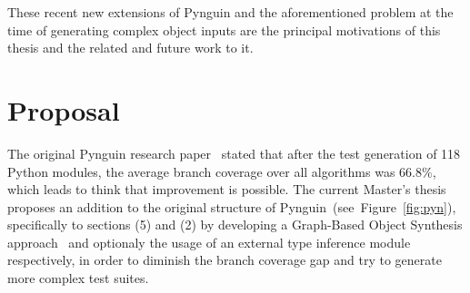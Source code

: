 \documentclass[%
  chapterprefix=false,%
  open=right,%
  twoside=true,%
  paper=a4,%
  logofile={Figures/logo.png},%
  thesistype=master,%
  UKenglish,%
]{se2thesis}
\begin{document}
These recent new extensions of Pynguin and the aforementioned problem at the time of generating complex object inputs are the principal motivations of this thesis and the related and future work to it.

\chapter{Proposal}

The original Pynguin research paper~\cite{DBLP:conf/icse/LukasczykF22} stated that after the test generation of 118 Python modules, the average branch coverage over all algorithms was $66.8\%$, which leads to think that improvement is possible.
The current Master's thesis proposes an addition to the original structure of Pynguin~(see~Figure~\ref{fig:pyn}), specifically to sections (5) and (2) by developing
a Graph-Based Object Synthesis approach~\cite{DBLP:conf/sigsoft/0001O00D21} and optionaly the usage of an external type inference module respectively, in order to diminish the branch coverage gap and try to generate more complex test suites.
\end{document}
